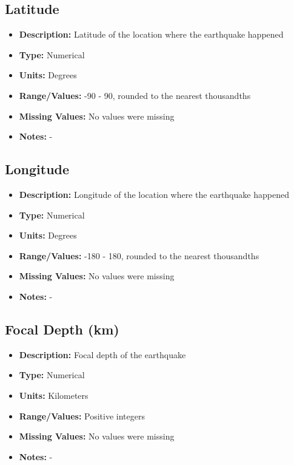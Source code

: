 \documentclass{article}
\begin{document}
\subsection{Latitude}
\begin{itemize}
    \item \textbf{Description:} Latitude of the location where the earthquake happened
    \item \textbf{Type:} Numerical
    \item \textbf{Units:} Degrees
    \item \textbf{Range/Values:} -90 - 90, rounded to the nearest thousandths
    \item \textbf{Missing Values:} No values were missing
    \item \textbf{Notes:} -
\end{itemize}

\subsection{Longitude}
\begin{itemize}
    \item \textbf{Description:} Longitude of the location where the earthquake happened
    \item \textbf{Type:} Numerical
    \item \textbf{Units:} Degrees
    \item \textbf{Range/Values:} -180 - 180, rounded to the nearest thousandths
    \item \textbf{Missing Values:} No values were missing
    \item \textbf{Notes:} -
\end{itemize}

\subsection{Focal Depth (km)}
\begin{itemize}
    \item \textbf{Description:} Focal depth of the earthquake
    \item \textbf{Type:} Numerical
    \item \textbf{Units:} Kilometers
    \item \textbf{Range/Values:} Positive integers
    \item \textbf{Missing Values:} No values were missing
    \item \textbf{Notes:} -
\end{itemize}
\end{document}

